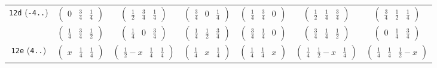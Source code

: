 \documentclass[fleqn,9pt,landscape]{jsarticle}
\begin{document}
\begin{center}
\begin{longtable}{ccccccc}
{\tt 12d} ({\tt -4..}) & $ \begin{pmatrix} 0 & \frac{3}{4} & \frac{1}{4} \end{pmatrix} $ & $ \begin{pmatrix} \frac{1}{2} & \frac{3}{4} & \frac{1}{4} \end{pmatrix} $ & $ \begin{pmatrix} \frac{3}{4} & 0 & \frac{1}{4} \end{pmatrix} $ & $ \begin{pmatrix} \frac{1}{4} & \frac{3}{4} & 0 \end{pmatrix} $ & $ \begin{pmatrix} \frac{1}{2} & \frac{1}{4} & \frac{3}{4} \end{pmatrix} $ & $ \begin{pmatrix} \frac{3}{4} & \frac{1}{2} & \frac{1}{4} \end{pmatrix} $ \\
& $ \begin{pmatrix} \frac{1}{4} & \frac{3}{4} & \frac{1}{2} \end{pmatrix} $ & $ \begin{pmatrix} \frac{1}{4} & 0 & \frac{3}{4} \end{pmatrix} $ & $ \begin{pmatrix} \frac{1}{4} & \frac{1}{2} & \frac{3}{4} \end{pmatrix} $ & $ \begin{pmatrix} \frac{3}{4} & \frac{1}{4} & 0 \end{pmatrix} $ & $ \begin{pmatrix} \frac{3}{4} & \frac{1}{4} & \frac{1}{2} \end{pmatrix} $ & $ \begin{pmatrix} 0 & \frac{1}{4} & \frac{3}{4} \end{pmatrix} $ \\ \hline
{\tt 12e} ({\tt 4..}) & $ \begin{pmatrix} x & \frac{1}{4} & \frac{1}{4} \end{pmatrix} $ & $ \begin{pmatrix} \frac{1}{2} - x & \frac{1}{4} & \frac{1}{4} \end{pmatrix} $ & $ \begin{pmatrix} \frac{1}{4} & x & \frac{1}{4} \end{pmatrix} $ & $ \begin{pmatrix} \frac{1}{4} & \frac{1}{4} & x \end{pmatrix} $ & $ \begin{pmatrix} \frac{1}{4} & \frac{1}{2} - x & \frac{1}{4} \end{pmatrix} $ & $ \begin{pmatrix} \frac{1}{4} & \frac{1}{4} & \frac{1}{2} - x \end{pmatrix} $ \\

\end{longtable}
\end{center}
\end{document}
